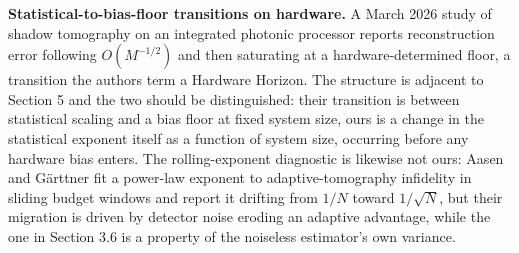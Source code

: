 %
%

\textbf{Statistical-to-bias-floor transitions on hardware.} A March 2026
study of shadow tomography on an integrated photonic processor
\cite{hardwarehorizon2026} reports reconstruction error following
\(O(M^{-1/2})\) and then saturating at a hardware-determined floor, a
transition the authors term a Hardware Horizon. The structure is adjacent
to Section 5 and the two should be distinguished: their transition is
between statistical scaling and a bias floor at fixed system size, ours is
a change in the statistical exponent itself as a function of system size,
occurring before any hardware bias enters. The rolling-exponent diagnostic
is likewise not ours: Aasen and G\"arttner \cite{aasen2026limitations}
fit a power-law exponent to adaptive-tomography infidelity in sliding
budget windows and report it drifting from \(1/N\) toward
\(1/\sqrt{N}\), but their migration is driven by detector noise eroding
an adaptive advantage, while the one in Section 3.6 is a property of the
noiseless estimator's own variance.

